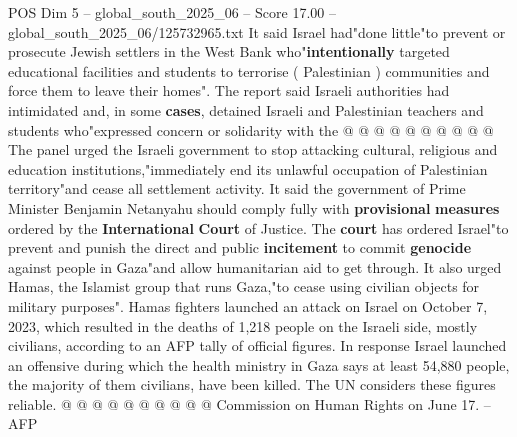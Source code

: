 \begin{textsample}{POS Dim 5 – global\_south\_2025\_06 – Score 17.00 – global\_south\_2025\_06/125732965.txt}
It said Israel had"done little"to prevent or prosecute Jewish settlers in the West Bank who"\textbf{intentionally} targeted educational facilities and students to terrorise ( Palestinian ) communities and force them to leave their homes".
The report said Israeli authorities had intimidated and, in some \textbf{cases}, detained Israeli and Palestinian teachers and students who"expressed concern or solidarity with the @ @ @ @ @ @ @ @ @ @ The panel urged the Israeli government to stop attacking cultural, religious and education institutions,"immediately end its unlawful occupation of Palestinian territory"and cease all settlement activity.
It said the government of Prime Minister Benjamin Netanyahu should comply fully with \textbf{provisional} \textbf{measures} ordered by the \textbf{International} \textbf{Court} of Justice.
The \textbf{court} has ordered Israel"to prevent and punish the direct and public \textbf{incitement} to commit \textbf{genocide} against people in Gaza"and allow humanitarian aid to get through.
It also urged Hamas, the Islamist group that runs Gaza,"to cease using civilian objects for military purposes".
Hamas fighters launched an attack on Israel on October 7, 2023, which resulted in the deaths of 1,218 people on the Israeli side, mostly civilians, according to an AFP tally of official figures.
In response Israel launched an offensive during which the health ministry in Gaza says at least 54,880 people, the majority of them civilians, have been killed.
The UN considers these figures reliable. @ @ @ @ @ @ @ @ @ @ Commission on Human Rights on June 17. -- AFP

\end{textsample}
